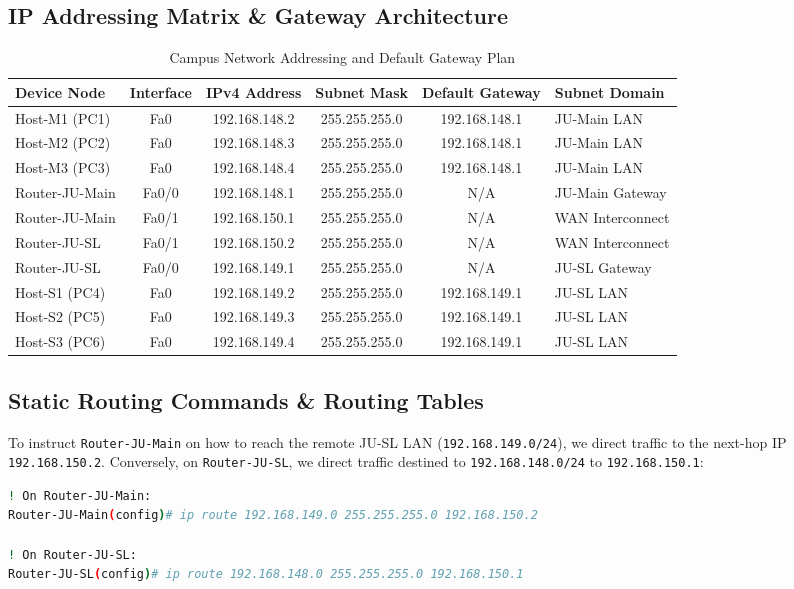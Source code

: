 \documentclass[12pt, a4paper]{article}
\begin{document}
\subsection{IP Addressing Matrix \& Gateway Architecture}
\begin{table}[H]
\centering
\caption{Campus Network Addressing and Default Gateway Plan}
\label{tab:prob5_matrix}
\begin{tabularx}{\textwidth}{lccccX}
\toprule
\textbf{Device Node} & \textbf{Interface} & \textbf{IPv4 Address} & \textbf{Subnet Mask} & \textbf{Default Gateway} & \textbf{Subnet Domain} \\
\midrule
Host-M1 (PC1) & Fa0 & 192.168.148.2 & 255.255.255.0 & 192.168.148.1 & JU-Main LAN \\
Host-M2 (PC2) & Fa0 & 192.168.148.3 & 255.255.255.0 & 192.168.148.1 & JU-Main LAN \\
Host-M3 (PC3) & Fa0 & 192.168.148.4 & 255.255.255.0 & 192.168.148.1 & JU-Main LAN \\
Router-JU-Main & Fa0/0 & 192.168.148.1 & 255.255.255.0 & N/A & JU-Main Gateway \\
Router-JU-Main & Fa0/1 & 192.168.150.1 & 255.255.255.0 & N/A & WAN Interconnect \\
\midrule
Router-JU-SL & Fa0/1 & 192.168.150.2 & 255.255.255.0 & N/A & WAN Interconnect \\
Router-JU-SL & Fa0/0 & 192.168.149.1 & 255.255.255.0 & N/A & JU-SL Gateway \\
Host-S1 (PC4) & Fa0 & 192.168.149.2 & 255.255.255.0 & 192.168.149.1 & JU-SL LAN \\
Host-S2 (PC5) & Fa0 & 192.168.149.3 & 255.255.255.0 & 192.168.149.1 & JU-SL LAN \\
Host-S3 (PC6) & Fa0 & 192.168.149.4 & 255.255.255.0 & 192.168.149.1 & JU-SL LAN \\
\bottomrule
\end{tabularx}
\end{table}

\subsection{Static Routing Commands \& Routing Tables}
To instruct \texttt{Router-JU-Main} on how to reach the remote JU-SL LAN (\texttt{192.168.149.0/24}), we direct traffic to the next-hop IP \texttt{192.168.150.2}. Conversely, on \texttt{Router-JU-SL}, we direct traffic destined to \texttt{192.168.148.0/24} to \texttt{192.168.150.1}:

\begin{lstlisting}[language=bash, caption={Cisco IOS Static Route Configuration}]
! On Router-JU-Main:
Router-JU-Main(config)# ip route 192.168.149.0 255.255.255.0 192.168.150.2

! On Router-JU-SL:
Router-JU-SL(config)# ip route 192.168.148.0 255.255.255.0 192.168.150.1
\end{lstlisting}
\end{document}
